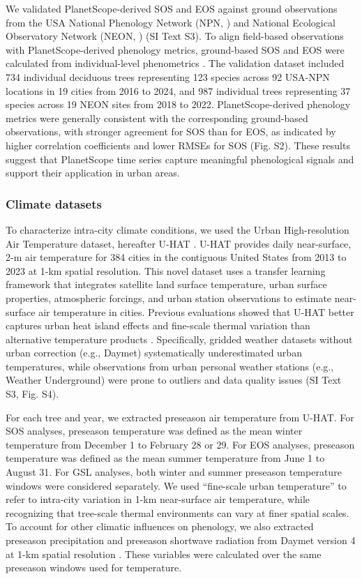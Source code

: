 We validated PlanetScope-derived SOS and EOS against ground observations from the USA National Phenology Network (NPN, \citet{rosemartin2018usa}) and National Ecological Observatory Network (NEON, \citet{Elmendorf2016Ecosphere}) (SI Text S3). To align field-based observations with PlanetScope-derived phenology metrics, ground-based SOS and EOS were calculated from individual-level phenometrics \citep{Xin2020IJAEOG, Zhao2022RSE}. The validation dataset included 734 individual deciduous trees representing 123 species across 92 USA-NPN locations in 19 cities from 2016 to 2024, and 987 individual trees representing 37 species across 19 NEON sites from 2018 to 2022. PlanetScope-derived phenology metrics were generally consistent with the corresponding ground-based observations, with stronger agreement for SOS than for EOS, as indicated by higher correlation coefficients and lower RMSEs for SOS (Fig. S2). These results suggest that PlanetScope time series capture meaningful phenological signals and support their application in urban areas.

\subsubsection{Climate datasets}

To characterize intra-city climate conditions, we used the Urban High-resolution Air Temperature dataset, hereafter U-HAT \citep{Zhang2026NatureCommunications}. U-HAT provides daily near-surface, 2-m air temperature for 384 cities in the contiguous United States from 2013 to 2023 at 1-km spatial resolution. This novel dataset uses a transfer learning framework that integrates satellite land surface temperature, urban surface properties, atmospheric forcings, and urban station observations to estimate near-surface air temperature in cities. Previous evaluations showed that U-HAT better captures urban heat island effects and fine-scale thermal variation than alternative temperature products \citep{Zhang2026NatureCommunications}. Specifically, gridded weather datasets without urban correction (e.g., Daymet) systematically underestimated urban temperatures, while observations from urban personal weather stations (e.g., Weather Underground) were prone to outliers and data quality issues (SI Text S3, Fig. S4). 

For each tree and year, we extracted preseason air temperature from U-HAT. For SOS analyses, preseason temperature was defined as the mean winter temperature from December 1 to February 28 or 29. For EOS analyses, preseason temperature was defined as the mean summer temperature from June 1 to August 31. For GSL analyses, both winter and summer preseason temperature windows were considered separately. We used “fine-scale urban temperature” to refer to intra-city variation in 1-km near-surface air temperature, while recognizing that tree-scale thermal environments can vary at finer spatial scales. To account for other climatic influences on phenology, we also extracted preseason precipitation and preseason shortwave radiation from Daymet version 4 at 1-km spatial resolution \citep{thornton2021gridded}. These variables were calculated over the same preseason windows used for temperature.

